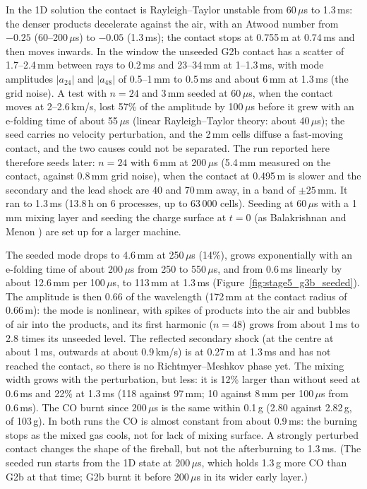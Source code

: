 \documentclass{article}
\begin{document}
In the 1D solution the contact is Rayleigh--Taylor unstable from 60\,$\mu$s to 1.3\,ms: the denser products decelerate against the air, with an Atwood number from $-0.25$ (60--200\,$\mu$s) to $-0.05$ (1.3\,ms); the contact stops at 0.755\,m at 0.74\,ms and then moves inwards. In the window the unseeded G2b contact has a scatter of 1.7--2.4\,mm between rays to 0.2\,ms and 23--34\,mm at 1--1.3\,ms, with mode amplitudes $|a_{24}|$ and $|a_{48}|$ of 0.5--1\,mm to 0.5\,ms and about 6\,mm at 1.3\,ms (the grid noise). A test with $n = 24$ and 3\,mm seeded at 60\,$\mu$s, when the contact moves at 2--2.6\,km/s, lost 57\% of the amplitude by 100\,$\mu$s before it grew with an e-folding time of about 55\,$\mu$s (linear Rayleigh--Taylor theory: about 40\,$\mu$s); the seed carries no velocity perturbation, and the 2\,mm cells diffuse a fast-moving contact, and the two causes could not be separated. The run reported here therefore seeds later: $n = 24$ with 6\,mm at 200\,$\mu$s (5.4\,mm measured on the contact, against 0.8\,mm grid noise), when the contact at 0.495\,m is slower and the secondary and the lead shock are 40 and 70\,mm away, in a band of $\pm 25$\,mm. It ran to 1.3\,ms (13.8\,h on 6 processes, up to 63\,000 cells). Seeding at 60\,$\mu$s with a 1\,mm mixing layer and seeding the charge surface at $t = 0$ (as Balakrishnan and Menon \cite{balakrishnan2009}) are set up for a larger machine.

The seeded mode drops to 4.6\,mm at 250\,$\mu$s (14\%), grows exponentially with an e-folding time of about 200\,$\mu$s from 250 to 550\,$\mu$s, and from 0.6\,ms linearly by about 12.6\,mm per 100\,$\mu$s, to 113\,mm at 1.3\,ms (Figure~\ref{fig:stage5_g3b_seeded}). The amplitude is then 0.66 of the wavelength (172\,mm at the contact radius of 0.66\,m): the mode is nonlinear, with spikes of products into the air and bubbles of air into the products, and its first harmonic ($n = 48$) grows from about 1\,ms to 2.8 times its unseeded level. The reflected secondary shock (at the centre at about 1\,ms, outwards at about 0.9\,km/s) is at 0.27\,m at 1.3\,ms and has not reached the contact, so there is no Richtmyer--Meshkov phase yet. The mixing width grows with the perturbation, but less: it is 12\% larger than without seed at 0.6\,ms and 22\% at 1.3\,ms (118 against 97\,mm; 10 against 8\,mm per 100\,$\mu$s from 0.6\,ms). The CO burnt since 200\,$\mu$s is the same within 0.1\,g (2.80 against 2.82\,g, of 103\,g). In both runs the CO is almost constant from about 0.9\,ms: the burning stops as the mixed gas cools, not for lack of mixing surface. A strongly perturbed contact changes the shape of the fireball, but not the afterburning to 1.3\,ms. (The seeded run starts from the 1D state at 200\,$\mu$s, which holds 1.3\,g more CO than G2b at that time; G2b burnt it before 200\,$\mu$s in its wider early layer.)
\end{document}
